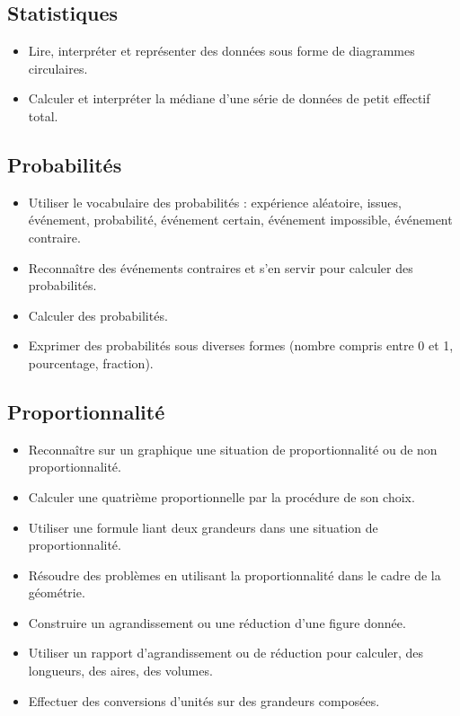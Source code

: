\documentclass[a4paper,12pt,fleqn]{article}	
\begin{document}
\renewcommand{\labelitemi}{}

\subsection*{Statistiques}

\begin{itemize}
	\item {}Lire, interpréter et représenter des données sous forme de diagrammes circulaires.
	\item {}Calculer et interpréter la médiane d’une série de données de petit effectif total.
\end{itemize}

\subsection*{Probabilités}

\begin{itemize}
	\item {}Utiliser le vocabulaire des probabilités : expérience aléatoire, issues, événement, probabilité, événement certain, événement impossible, événement contraire.
	\item {}Reconnaître des événements contraires et s’en servir pour calculer des probabilités.
	\item {}Calculer des probabilités.
	\item {}Exprimer des probabilités sous diverses formes (nombre compris entre 0 et 1, pourcentage, fraction).
\end{itemize}

\subsection*{Proportionnalité}

\begin{itemize}
	\item {}Reconnaître sur un graphique une situation de proportionnalité ou de non proportionnalité.
	\item {}Calculer une quatrième proportionnelle par la procédure de son choix.
	\item {}Utiliser une formule liant deux grandeurs dans une situation de proportionnalité.
	\item {}Résoudre des problèmes en utilisant la proportionnalité dans le cadre de la géométrie.
	\item {}Construire un agrandissement ou une réduction d’une figure donnée.
	\item {}Utiliser un rapport d’agrandissement ou de réduction pour calculer, des longueurs, des aires, des volumes.
	\item {}Effectuer des conversions d’unités sur des grandeurs composées.
\end{itemize}
\end{document}
